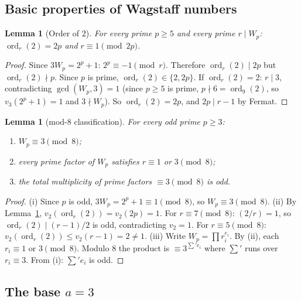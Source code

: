 \documentclass[11pt,a4paper]{amsart}
\theoremstyle{plain}
\newtheorem{lemma}[theorem]{Lemma}
\theoremstyle{definition}
\DeclareMathOperator{\ord}{ord}
\begin{document}
\subsection{Basic properties of Wagstaff numbers}

\begin{lemma}[Order of $2$]
\label{lem:order-2}
For every prime $p \geq 5$ and every prime $r \mid W_p$: $\ord_r(2) =
2p$ and $r \equiv 1 \pmod{2p}$.
\end{lemma}

\begin{proof}
Since $3 W_p = 2^p + 1$: $2^p \equiv -1 \pmod{r}$. Therefore
$\ord_r(2) \mid 2p$ but $\ord_r(2) \nmid p$. Since $p$ is prime,
$\ord_r(2) \in \{2, 2p\}$. If $\ord_r(2) = 2$: $r \mid 3$,
contradicting $\gcd(W_p, 3) = 1$ (since $p \geq 5$ is prime, $p \nmid
6 = \ord_9(2)$, so $v_3(2^p + 1) = 1$ and $3 \nmid W_p$). So
$\ord_r(2) = 2p$, and $2p \mid r - 1$ by Fermat.
\end{proof}

\begin{lemma}[mod-$8$ classification]
\label{lem:mod8}
For every odd prime $p \geq 3$:
\begin{enumerate}
\item[(i)]   $W_p \equiv 3 \pmod{8}$;
\item[(ii)]  every prime factor of $W_p$ satisfies $r \equiv 1$ or
             $3 \pmod{8}$;
\item[(iii)] the total multiplicity of prime factors $\equiv 3 \pmod 8$
             is odd.
\end{enumerate}
\end{lemma}

\begin{proof}
(i) Since $p$ is odd, $3 W_p = 2^p + 1 \equiv 1 \pmod 8$, so $W_p
\equiv 3 \pmod 8$. (ii) By Lemma~\ref{lem:order-2}, $v_2(\ord_r(2)) =
v_2(2p) = 1$. For $r \equiv 7 \pmod 8$: $(2/r) = 1$, so $\ord_r(2)
\mid (r-1)/2$ is odd, contradicting $v_2 = 1$. For $r \equiv 5 \pmod
8$: $v_2(\ord_r(2)) \leq v_2(r-1) = 2 \neq 1$. (iii) Write $W_p =
\prod r_i^{e_i}$. By (ii), each $r_i \equiv 1$ or $3 \pmod 8$. Modulo
$8$ the product is $\equiv 3^{\sum' e_i}$ where $\sum'$ runs over
$r_i \equiv 3$. From (i): $\sum' e_i$ is odd.
\end{proof}

\subsection{The base $a=3$}
\end{document}
